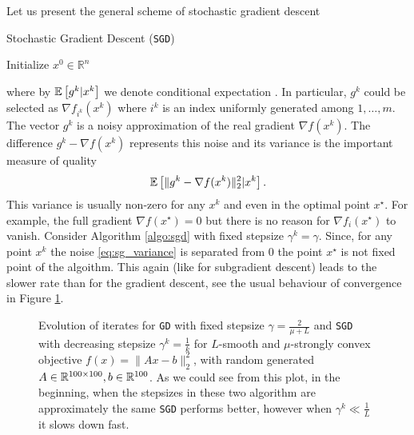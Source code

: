Let us present the general scheme of stochastic gradient descent
\begin{algorithm}
    \caption{Stochastic Gradient Descent (\texttt{SGD})}
    \label{algo:sgd}
    \begin{algorithmic}
        \STATE Initialize $x^0\in\mathbb{R}^n$
        \ENDFOR
    \end{algorithmic}
\end{algorithm}
where by $\mathbb{E}\left[g^k|x^k\right]$ we denote conditional expectation \cite[Chapter IV, Section $4$]{kolmogorov1933grundbegriffe}.
In particular, $g^k$ could be selected as $\nabla f_{i^k}(x^k)$ where $i^k$ is an index uniformly generated among $1,\ldots, m$. The vector $g^k$ is a noisy approximation of the real gradient $\nabla f(x^k)$. The difference $g^k- \nabla f(x^k)$ represents this noise and its variance is the important measure of quality
\begin{equation}\label{eq:sg_variance}
    \mathbb{E}\left[\|g^k - \nabla f(x^k)\|_2^2|x^k\right].
\end{equation}
This variance is usually non-zero for any $x^k$ and even in the optimal point $x^\star$. For example, the full gradient $\nabla f(x^\star) = 0$ but there is no reason for $\nabla f_i(x^\star)$ to vanish. {Consider Algorithm \ref{algo:sgd} with fixed stepsize $\gamma^k = \gamma$. Since, for any point $x^k$ the noise \eqref{eq:sg_variance} is separated from $0$ the point $x^\star$ is not fixed point of the algoithm.} This again (like for subgradient descent) leads to the slower rate than for the gradient descent, see the usual behaviour of convergence in Figure \ref{fig:sgd_vs_gd}.

\begin{figure}[H]
    \centering
    
    \caption{Evolution of iterates for \texttt{GD} with fixed stepsize $\gamma = \frac{2}{\mu + L}$ and \texttt{SGD} with decreasing stepsize $\gamma^k = \frac{1}{k}$ for $L$-smooth and $\mu$-strongly convex objective $f(x) = \|Ax-b\|_2^2$, with random generated $A\in\mathbb{R}^{100\times100},b\in\mathbb{R}^{100}$. As we could see from this plot, in the beginning, when the stepsizes in these two algorithm are approximately the same \texttt{SGD} performs better, however when $\gamma^k\ll \frac{1}{L}$ it slows down fast.}
    \label{fig:sgd_vs_gd}
\end{figure}

